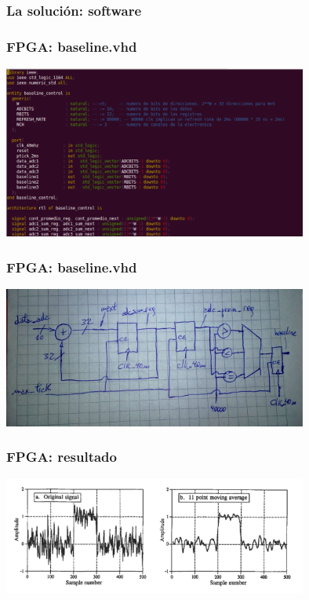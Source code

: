 \documentclass{beamer}
\begin{document}
\subsubsection{La solución: software}
\begin{frame}
  \frametitle{FPGA: baseline.vhd}
  \begin{block}{}
    \centering
    \includegraphics[height=0.55\textheight,width=0.75\textwidth]{d5/baseline_vhd}
  \end{block}
\end{frame}

\begin{frame}
  \frametitle{FPGA: baseline.vhd}
  \begin{block}{}
    \centering
    \includegraphics[height=0.60\textheight,width=0.75\textwidth]{d5/ma_filter_lago2}
  \end{block}
\end{frame}

\begin{frame}
  \frametitle{FPGA: resultado}
  \begin{block}{}
    \centering
    \includegraphics[height=0.50\textheight,width=0.75\textwidth]{d5/resultado_ma_filter_ej}
  \end{block}
\end{frame}
\end{document}
